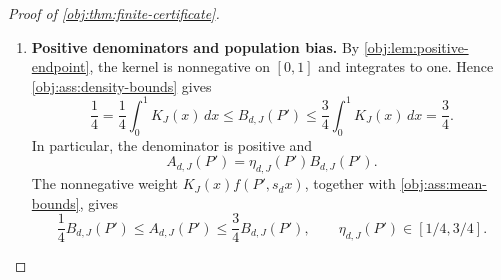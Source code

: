 \begin{proof}[Proof of \cref{obj:thm:finite-certificate}]
\begin{enumerate}
Define the centered empirical errors on the sample and seed space by
\[
\begin{aligned}
\Delta^{\mathrm A}_{d,J}(S_n,U)
&=\widehat A_{d,J}(S_n)-A_{d,J}(P'),\\
\Delta^{\mathrm B}_{d,J}(S_n,U)
&=\widehat B_{d,J}(S_n)-B_{d,J}(P').
\end{aligned}
\]
The empirical averages are those of \cref{obj:def:ratio}. For either
\(\diamond\in\{\mathrm A,\mathrm B\}\), the population identities show that
\[
\Delta^\diamond_{d,J}
=\frac1n\sum_{i=1}^n
\left[
\xi^\diamond_{d,J}(D_i,Y_i,W_i)
-\int\xi^\diamond_{d,J}\,dP'_{\mathrm{obs}}
\right].
\]
Independence makes the cross terms between distinct centered observations vanish. Expanding the square therefore gives
\[
\begin{aligned}
\mathbb E_{P',n}\Delta^\diamond_{d,J}&=0,\\
\mathbb E_{P',n}(\Delta^\diamond_{d,J})^2
&=\frac1n\int
\left(\xi^\diamond_{d,J}
-\int\xi^\diamond_{d,J}\,dP'_{\mathrm{obs}}\right)^2
dP'_{\mathrm{obs}}\\
&=\frac1n\left[
\int(\xi^\diamond_{d,J})^2\,dP'_{\mathrm{obs}}
-\left(\int\xi^\diamond_{d,J}\,dP'_{\mathrm{obs}}\right)^2
\right]\\
&\le\frac{V_J(\sigma)}n.
\end{aligned}
\]
These errors are square integrable. Integrating the independent seed contributes a factor one, since the averages depend on the sample. The same mean calculation proves
\[
\mathbb E_{P',n}\widehat B_{d,J}=B_{d,J}(P').
\]

\item \textbf{Positive denominators and population bias.}
By \cref{obj:lem:positive-endpoint}, the kernel is nonnegative on \([0,1]\) and integrates to one. Hence \cref{obj:ass:density-bounds} gives
\[
\frac14
=\frac14\int_0^1K_J(x)\,dx
\le B_{d,J}(P')
\le\frac34\int_0^1K_J(x)\,dx
=\frac34.
\]
In particular, the denominator is positive and
\[
A_{d,J}(P')=\eta_{d,J}(P')B_{d,J}(P').
\]
The nonnegative weight \(K_J(x)f(P',s_dx)\), together with
\cref{obj:ass:mean-bounds}, gives
\[
\frac14B_{d,J}(P')
\le A_{d,J}(P')
\le\frac34B_{d,J}(P'),
\qquad
\eta_{d,J}(P')\in[1/4,3/4].
\]


\end{enumerate}
\end{proof}
